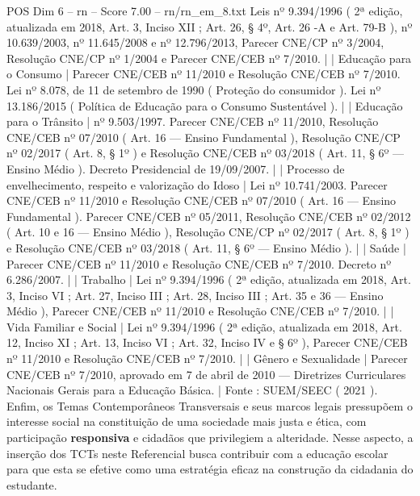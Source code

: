 \begin{textsample}{POS Dim 6 – rn – Score 7.00 – rn/rn\_em\_8.txt}
Leis nº 9.394/1996 ( 2ª edição, atualizada em 2018, Art. 3, Inciso XII ; Art. 26, § 4º, Art. 26 -A e Art. 79-B ), nº 10.639/2003, nº 11.645/2008 e nº 12.796/2013, Parecer CNE/CP nº 3/2004, Resolução CNE/CP nº 1/2004 e Parecer CNE/CEB nº 7/2010. | | Educação para o Consumo | Parecer CNE/CEB nº 11/2010 e Resolução CNE/CEB nº 7/2010.
Lei nº 8.078, de 11 de setembro de 1990 ( Proteção do consumidor ).
Lei nº 13.186/2015 ( Política de Educação para o Consumo Sustentável ). | | Educação para o Trânsito | nº 9.503/1997.
Parecer CNE/CEB nº 11/2010, Resolução CNE/CEB nº 07/2010 ( Art. 16 — Ensino Fundamental ), Resolução CNE/CP nº 02/2017 ( Art. 8, § 1º ) e Resolução CNE/CEB nº 03/2018 ( Art. 11, § 6º — Ensino Médio ).
Decreto Presidencial de 19/09/2007. | | Processo de envelhecimento, respeito e valorização do Idoso | Lei nº 10.741/2003.
Parecer CNE/CEB nº 11/2010 e Resolução CNE/CEB nº 07/2010 ( Art. 16 — Ensino Fundamental ).
Parecer CNE/CEB nº 05/2011, Resolução CNE/CEB nº 02/2012 ( Art. 10 e 16 — Ensino Médio ), Resolução CNE/CP nº 02/2017 ( Art. 8, § 1º ) e Resolução CNE/CEB nº 03/2018 ( Art. 11, § 6º — Ensino Médio ). | | Saúde | Parecer CNE/CEB nº 11/2010 e Resolução CNE/CEB nº 7/2010.
Decreto nº 6.286/2007. | | Trabalho | Lei nº 9.394/1996 ( 2ª edição, atualizada em 2018, Art. 3, Inciso VI ; Art. 27, Inciso III ; Art. 28, Inciso III ; Art. 35 e 36 — Ensino Médio ), Parecer CNE/CEB nº 11/2010 e Resolução CNE/CEB nº 7/2010. | | Vida Familiar e Social | Lei nº 9.394/1996 ( 2ª edição, atualizada em 2018, Art. 12, Inciso XI ; Art. 13, Inciso VI ; Art. 32, Inciso IV e § 6º ), Parecer CNE/CEB nº 11/2010 e Resolução CNE/CEB nº 7/2010. | | Gênero e Sexualidade | Parecer CNE/CEB nº 7/2010, aprovado em 7 de abril de 2010 — Diretrizes Curriculares Nacionais Gerais para a Educação Básica. | Fonte : SUEM/SEEC ( 2021 ).
Enfim, os Temas Contemporâneos Transversais e seus marcos legais pressupõem o interesse social na constituição de uma sociedade mais justa e ética, com participação \textbf{responsiva} e cidadãos que privilegiem a alteridade.
Nesse aspecto, a inserção dos TCTs neste Referencial busca contribuir com a educação escolar para que esta se efetive como uma estratégia eficaz na construção da cidadania do estudante.

\end{textsample}
